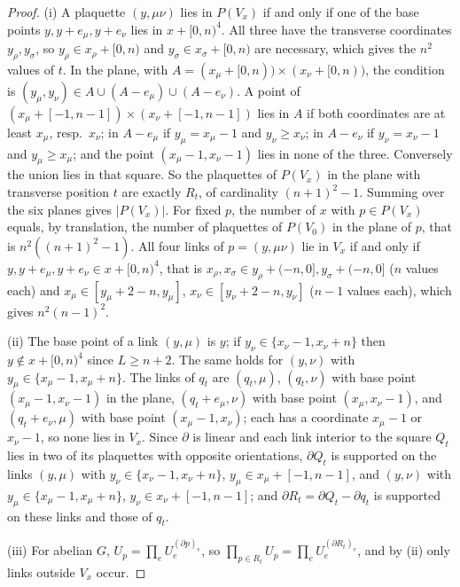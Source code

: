 \begin{proof}
(i) A plaquette $(y,\mu\nu)$ lies in $P(V_x)$ if and only if one of the
base points $y,y+e_\mu,y+e_\nu$ lies in $x+[0,n)^4$. All three have the
transverse coordinates $y_\rho,y_\sigma$, so $y_\rho\in x_\rho+[0,n)$ and
$y_\sigma\in x_\sigma+[0,n)$ are necessary, which gives the $n^2$ values of
$t$. In the plane, with $A=(x_\mu+[0,n))\times(x_\nu+[0,n))$, the condition
is $(y_\mu,y_\nu)\in A\cup(A-e_\mu)\cup(A-e_\nu)$. A point of
$(x_\mu+[-1,n-1])\times(x_\nu+[-1,n-1])$ lies in $A$ if both coordinates
are at least $x_\mu$, resp.\ $x_\nu$; in $A-e_\mu$ if $y_\mu=x_\mu-1$ and
$y_\nu\ge x_\nu$; in $A-e_\nu$ if $y_\nu=x_\nu-1$ and $y_\mu\ge x_\mu$; and
the point $(x_\mu-1,x_\nu-1)$ lies in none of the three. Conversely the
union lies in that square. So the plaquettes of $P(V_x)$ in the plane with
transverse position $t$ are exactly $R_t$, of cardinality $(n+1)^2-1$.
Summing over the six planes gives $\lvert P(V_x)\rvert$. For fixed $p$, the
number of $x$ with $p\in P(V_x)$ equals, by translation, the number of
plaquettes of $P(V_0)$ in the plane of $p$, that is $n^2((n+1)^2-1)$. All
four links of $p=(y,\mu\nu)$ lie in $V_x$ if and only if $y,y+e_\mu,y+e_\nu
\in x+[0,n)^4$, that is $x_\rho,x_\sigma\in y_\rho+(-n,0],y_\sigma+(-n,0]$
($n$ values each) and $x_\mu\in[y_\mu+2-n,y_\mu]$, $x_\nu\in[y_\nu+2-n,
y_\nu]$ ($n-1$ values each), which gives $n^2(n-1)^2$.

(ii) The base point of a link $(y,\mu)$ is $y$; if $y_\nu\in\{x_\nu-1,
x_\nu+n\}$ then $y\notin x+[0,n)^4$ since $L\ge n+2$. The same holds for
$(y,\nu)$ with $y_\mu\in\{x_\mu-1,x_\mu+n\}$. The links of $q_t$ are
$(q_t,\mu)$, $(q_t,\nu)$ with base point $(x_\mu-1,x_\nu-1)$ in the plane,
$(q_t+e_\mu,\nu)$ with base point $(x_\mu,x_\nu-1)$, and $(q_t+e_\nu,\mu)$
with base point $(x_\mu-1,x_\nu)$; each has a coordinate $x_\mu-1$ or
$x_\nu-1$, so none lies in $V_x$. Since $\partial$ is linear and each link
interior to the square $Q_t$ lies in two of its plaquettes with opposite
orientations, $\partial Q_t$ is supported on the links $(y,\mu)$ with
$y_\nu\in\{x_\nu-1,x_\nu+n\}$, $y_\mu\in x_\mu+[-1,n-1]$, and $(y,\nu)$ with
$y_\mu\in\{x_\mu-1,x_\mu+n\}$, $y_\nu\in x_\nu+[-1,n-1]$; and $\partial R_t=
\partial Q_t-\partial q_t$ is supported on these links and those of $q_t$.

(iii) For abelian $G$, $U_p=\prod_eU_e^{(\partial p)_e}$, so $\prod_{p\in
R_t}U_p=\prod_eU_e^{(\partial R_t)_e}$, and by (ii) only links outside
$V_x$ occur.
\end{proof}

